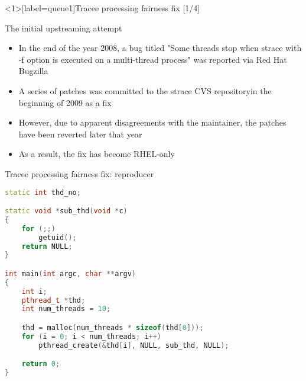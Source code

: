 \documentclass[unicode]{beamer}
\begin{document}
\begin{frame}<1>[label=queue1]{Tracee processing fairness fix \hfill [1/4]}
\begin{block}{\large The initial upstreaming attempt}
\begin{itemize}
  \item In the end of the year 2008, a bug titled "Some threads stop when
        strace with -f option is executed on a multi-thread process"
        was reported via Red Hat Bugzilla
  \pause
  \item A series of patches was committed to the strace CVS repository\footnotemark[1]\footnotemark[2]\footnotemark[3]\footnotemark[4]
        in the beginning of 2009 as a fix
  \item However, due to apparent disagreements with the maintainer\footnotemark[5]\footnotemark[6]\footnotemark[7],
        the patches have been reverted later that year\footnotemark[8]
  \item As a result, the fix has become RHEL-only
\end{itemize}
\end{block}
\end{frame}

\begin{frame}[fragile]{Tracee processing fairness fix: reproducer}
\begin{scriptsize}
\begin{lstlisting}[language=C++,basicstyle=\ttfamily]
static int thd_no;

static void *sub_thd(void *c)
{
	for (;;)
		getuid();
	return NULL;
}

int main(int argc, char **argv)
{
	int i;
	pthread_t *thd;
	int num_threads = 10;

	thd = malloc(num_threads * sizeof(thd[0]));
	for (i = 0; i < num_threads; i++)
		pthread_create(&thd[i], NULL, sub_thd, NULL);

	return 0;
}
\end{lstlisting}
\end{scriptsize}
\end{frame}
\end{document}
